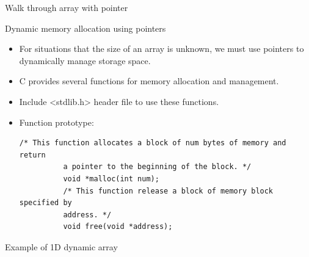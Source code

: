 \documentclass[10pt,t]{beamer}
\begin{document}
\begin{frame}[fragile]{Walk through array with pointer}
  
\end{frame}

\begin{frame}[fragile]{Dynamic memory allocation using pointers}
  \begin{itemize}
  \item For situations that the size of an array is unknown, we must use
    pointers to dynamically manage storage space.
    \item C provides several functions for memory allocation and
    management.
    \item Include <stdlib.h> header file to use these functions.
    \item Function prototype:
      \begin{lstlisting}[basicstyle=\scriptsize\ttfamily]
          /* This function allocates a block of num bytes of memory and return
          a pointer to the beginning of the block. */
          void *malloc(int num);
          /* This function release a block of memory block specified by
          address. */
          void free(void *address);
      \end{lstlisting}
  \end{itemize}
\end{frame}

\begin{frame}[fragile]{Example of 1D dynamic array}
  
\end{frame}

\end{document}

